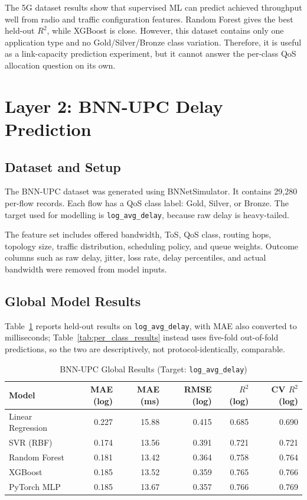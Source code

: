 \documentclass[a4paper,12pt]{Classes/RoboticsLaTeX}
\begin{document}
The 5G dataset results show that supervised ML can predict achieved throughput well from radio and traffic configuration features. Random Forest gives the best held-out $R^2$, while XGBoost is close. However, this dataset contains only one application type and no Gold/Silver/Bronze class variation. Therefore, it is useful as a link-capacity prediction experiment, but it cannot answer the per-class QoS allocation question on its own.

\section{Layer 2: BNN-UPC Delay Prediction}

\subsection{Dataset and Setup}

The BNN-UPC dataset was generated using BNNetSimulator. It contains 29,280 per-flow records. Each flow has a QoS class label: Gold, Silver, or Bronze. The target used for modelling is \texttt{log\_avg\_delay}, because raw delay is heavy-tailed.

The feature set includes offered bandwidth, ToS, QoS class, routing hops, topology size, traffic distribution, scheduling policy, and queue weights. Outcome columns such as raw delay, jitter, loss rate, delay percentiles, and actual bandwidth were removed from model inputs.

\subsection{Global Model Results}

Table~\ref{tab:bnnupc_global_results} reports held-out results on \texttt{log\_avg\_delay}, with MAE also converted to milliseconds; Table~\ref{tab:per_class_results} instead uses five-fold out-of-fold predictions, so the two are descriptively, not protocol-identically, comparable.

\begin{table}[H]
\centering
\caption{BNN-UPC Global Results (Target: \texttt{log\_avg\_delay})}
\label{tab:bnnupc_global_results}
\begingroup
\footnotesize
\setlength{\tabcolsep}{4pt}
\begin{tabular}{|l|r|r|r|r|r|}
\hline
\textbf{Model} & \textbf{MAE (log)} & \textbf{MAE (ms)} & \textbf{RMSE (log)} & \textbf{$R^2$ (log)} & \textbf{CV $R^2$ (log)} \\
\hline
Linear Regression & 0.227 & 15.88 & 0.415 & 0.685 & 0.690 \\
\hline
SVR (RBF) & 0.174 & 13.56 & 0.391 & 0.721 & 0.721 \\
\hline
Random Forest & 0.181 & 13.42 & 0.364 & 0.758 & 0.764 \\
\hline
XGBoost & 0.185 & 13.52 & 0.359 & 0.765 & 0.766 \\
\hline
PyTorch MLP & 0.185 & 13.67 & 0.357 & 0.766 & 0.769 \\
\hline
\end{tabular}
\endgroup
\end{table}
\end{document}
